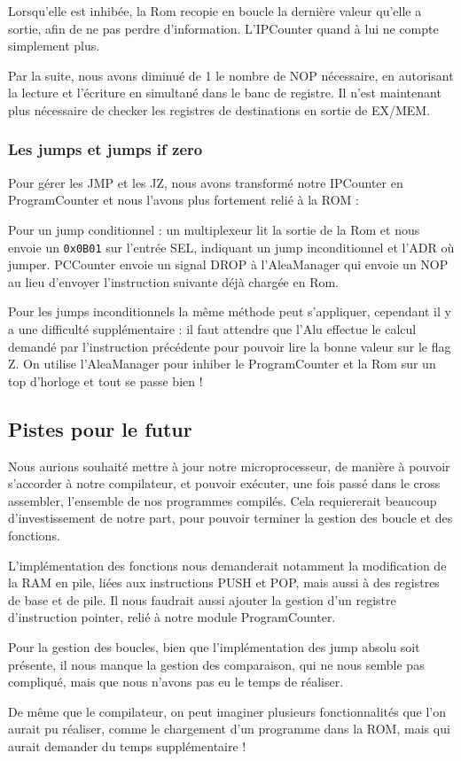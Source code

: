    Lorsqu'elle est inhibée, la Rom recopie en boucle la dernière valeur qu'elle a sortie, afin de ne pas perdre d'information.
   L'IPCounter quand à lui ne compte simplement plus.
   
   Par la suite, nous avons diminué de 1 le nombre de NOP nécessaire, en autorisant la lecture et l'écriture en simultané dans le banc de registre. Il n'est maintenant plus nécessaire de checker les registres de destinations en sortie de EX/MEM.
   
   
    \subsubsection*{Les jumps et jumps if zero}
   Pour gérer les JMP et les JZ, nous avons transformé notre IPCounter en ProgramCounter et nous l'avons plus fortement relié à la ROM : 
   
   Pour un jump conditionnel : un multiplexeur lit la sortie de la Rom et nous envoie un \texttt{0x0B01} sur l'entrée SEL, indiquant un jump inconditionnel et l'ADR où jumper.
   PCCounter envoie un signal DROP à l'AleaManager qui envoie un NOP au lieu d'envoyer l'instruction suivante déjà chargée en Rom.
   
   Pour les jumps inconditionnels la même méthode peut s'appliquer, cependant il y a une difficulté supplémentaire : il faut attendre que l'Alu effectue le calcul demandé par l'instruction précédente pour pouvoir lire la bonne valeur sur le flag Z. On utilise l'AleaManager pour inhiber le ProgramCounter et la Rom sur un top d'horloge et tout se passe bien !
    
    
    \subsection{Pistes pour le futur}
    Nous aurions souhaité mettre à jour notre microprocesseur, de manière à pouvoir s'accorder à notre compilateur, et pouvoir exécuter, une fois passé dans le cross assembler, l'ensemble de nos programmes compilés. Cela requiererait beaucoup d'investissement de notre part, pour pouvoir terminer la gestion des boucle et des fonctions.
    
    L'implémentation des fonctions nous demanderait notamment la modification de la RAM en pile, liées aux instructions PUSH et POP, mais aussi à des registres de base et de pile. Il nous faudrait  aussi ajouter la gestion d'un registre d'instruction pointer, relié à notre module ProgramCounter.
    
    Pour la gestion des boucles, bien que l'implémentation des jump absolu soit présente, il nous manque la gestion des comparaison, qui ne nous semble pas compliqué, mais que nous n'avons pas eu le temps de réaliser.
    
    De même que le compilateur, on peut imaginer plusieurs fonctionnalités que l'on aurait pu réaliser, comme le chargement d'un programme dans la ROM, mais qui aurait demander du temps supplémentaire !
